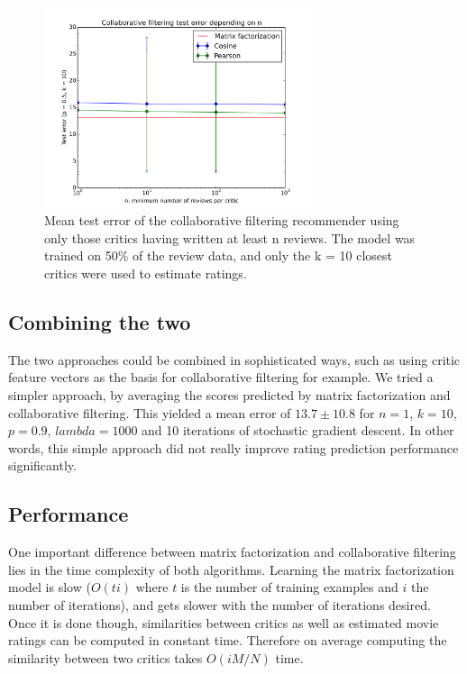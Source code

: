 \documentclass[10.5pt]{article}
\begin{document}
\begin{figure}[H]
\centering
\includegraphics[width=0.7\textwidth]{../plots/collab/graph_n.png}
\caption{Mean test error of the collaborative filtering recommender using only
    those critics having written at least n reviews. The model was trained on
    50\% of the review data, and only the k = 10 closest critics were used to
    estimate ratings.}
\label{fig:collab_n}
\end{figure}

\subsection{Combining the two}

The two approaches could be combined in sophisticated ways, such as using
critic feature vectors as the basis for collaborative filtering for example.
We tried a simpler approach, by averaging the scores predicted by matrix
factorization and collaborative filtering. This yielded a mean error of
$13.7 \pm 10.8$ for $n = 1$, $k = 10$, $p = 0.9$, $lambda = 1000$ and 10
iterations of stochastic gradient descent. In other words, this simple approach
did not really improve rating prediction performance significantly.

\subsection{Performance}

One important difference between matrix factorization and collaborative
filtering lies in the time complexity of both algorithms. Learning the matrix
factorization model is slow ($O(ti)$ where $t$ is the number of training 
examples and $i$ the number of iterations), and gets slower with
the number of iterations desired. Once it is done though, similarities between
critics as well as estimated movie ratings can be computed in constant time.
Therefore on average computing the similarity between two critics takes
$O(iM/N)$ time.
\end{document}
